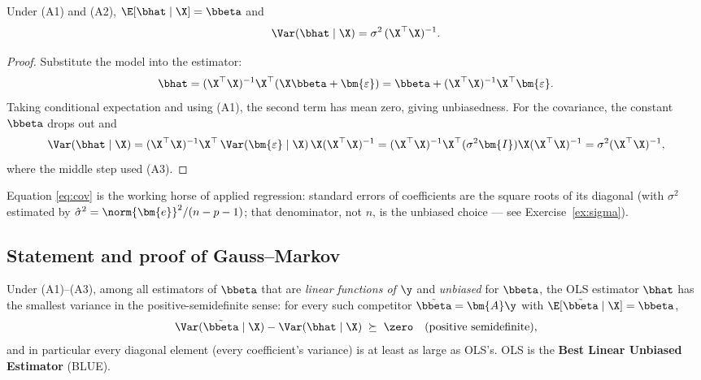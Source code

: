 \begin{lemma}\label{lem:unbiased}
Under (A1) and (A2), $\E[\bhat \mid \X] = \bbeta$ and
\begin{equation}\label{eq:cov}
  \Var(\bhat \mid \X) = \sigma^2 \, (\X^\top \X)^{-1}.
\end{equation}
\end{lemma}
\begin{proof}
Substitute the model into the estimator:
\[
  \bhat = (\X^\top\X)^{-1}\X^\top(\X\bbeta + \bm{\varepsilon}) = \bbeta + (\X^\top\X)^{-1}\X^\top \bm{\varepsilon}.
\]
Taking conditional expectation and using (A1), the second term has mean zero, giving unbiasedness. For the covariance, the constant $\bbeta$ drops out and
\[
  \Var(\bhat \mid \X) = (\X^\top\X)^{-1}\X^\top \, \Var(\bm{\varepsilon}\mid\X) \, \X (\X^\top\X)^{-1}
  = (\X^\top\X)^{-1}\X^\top (\sigma^2 \bm{I}) \X (\X^\top\X)^{-1} = \sigma^2 (\X^\top\X)^{-1},
\]
where the middle step used (A3).
\end{proof}

Equation \eqref{eq:cov} is the working horse of applied regression: standard errors of coefficients are the square roots of its diagonal (with $\sigma^2$ estimated by $\hat{\sigma}^2 = \norm{\bm{e}}^2/(n-p-1)$; that denominator, not $n$, is the unbiased choice — see Exercise~\ref{ex:sigma}).

\subsection{Statement and proof of Gauss--Markov}

\begin{theorem}\label{thm:gm}
Under (A1)--(A3), among all estimators of $\bbeta$ that are \emph{linear functions of $\y$} and \emph{unbiased} for $\bbeta$, the OLS estimator $\bhat$ has the smallest variance in the positive-semidefinite sense: for every such competitor $\tilde{\bbeta} = \bm{A}\y$ with $\E[\tilde{\bbeta}\mid\X] = \bbeta$,
\[
  \Var(\tilde{\bbeta} \mid \X) - \Var(\bhat \mid \X) \;\succeq\; \zero
  \quad (\text{positive semidefinite}),
\]
and in particular every diagonal element (every coefficient's variance) is at least as large as OLS's. OLS is the \textbf{Best Linear Unbiased Estimator} (BLUE).
\end{theorem}


